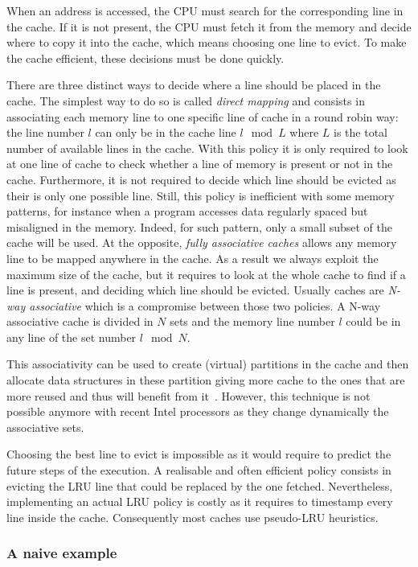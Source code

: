 When an address is accessed, the \gls{CPU} must search for the corresponding line in the cache.
If it is not present, the \gls{CPU} must fetch it from the memory and decide where to copy it into the cache, which means choosing one line to evict.
To make the cache efficient, these decisions must be done quickly.

There are three distinct ways to decide where a line should be placed in the cache.
The simplest way to do so is called \emph{direct mapping} and consists in associating each memory line to one specific line of cache in a round robin way: the line number $l$ can only be in the cache line $l \mod L$ where $L$ is the total number of available lines in the cache.
With this policy it is only required to look at one line of cache to check whether a line of memory is present or not in the cache.
Furthermore, it is not required to decide which line should be evicted as their is only one possible line.
Still, this policy is inefficient with some memory patterns, for instance when a program accesses data regularly spaced but misaligned in the memory.
Indeed, for such pattern, only a small subset of the cache will be used.
At the opposite, \emph{fully associative caches} allows any memory line to be mapped anywhere in the cache.
As a result we always exploit the maximum size of the cache, but it requires to look at the whole cache to find if a line is present, and deciding which line should be evicted.
Usually caches are \emph{N-way associative} which is a compromise between those two policies.
A N-way associative cache is divided in $N$ sets and the memory line number $l$ could be in any line of the set number $l \mod N$.

This associativity can be used to create (virtual) partitions in the cache and then allocate data structures in these partition giving more cache to the ones that are more reused and thus will benefit from it~\cite{Perarnau11Controlling}.
However, this technique is not possible anymore with recent \gls{Intel} processors as they change dynamically the associative sets.

Choosing the best line to evict is impossible as it would require to predict the future steps of the execution.
A realisable and often efficient policy consists in evicting the \gls{LRU} line that could be replaced by the one fetched.
Nevertheless, implementing an actual \gls{LRU} policy is costly as it requires to timestamp every line inside the cache.
Consequently most caches use pseudo-\gls{LRU} heuristics.

\subsubsection{A naive example}

